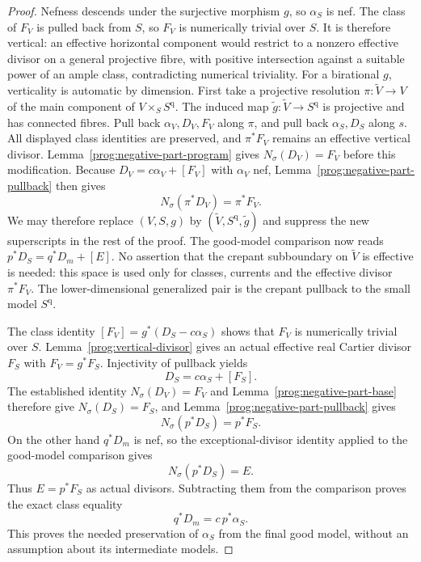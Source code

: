 \begin{proof}
Nefness descends under the surjective morphism $g$, so $\alpha_S$ is nef.
The class of $F_V$ is pulled back from $S$, so $F_V$ is numerically
trivial over $S$. It is therefore vertical: an effective horizontal
component would restrict to a nonzero effective divisor on a general
projective fibre, with positive intersection against a suitable power
of an ample class, contradicting numerical triviality. For a
birational $g$, verticality is automatic by dimension.
First take a projective resolution $\pi:\widetilde V\to V$ of the main
component of $V\times_S S^{\mathrm q}$. The induced map
$\widetilde g:\widetilde V\to S^{\mathrm q}$ is projective and has
connected fibres. Pull back $\alpha_V,D_V,F_V$ along $\pi$, and pull
back $\alpha_S,D_S$ along $s$. All displayed class identities are
preserved, and $\pi^*F_V$ remains an effective vertical divisor.
Lemma~\ref{prog:negative-part-program} gives
$N_\sigma(D_V)=F_V$ before this modification. Because
$D_V=c\alpha_V+[F_V]$ with $\alpha_V$ nef,
Lemma~\ref{prog:negative-part-pullback} then gives
\[
              N_\sigma(\pi^*D_V)=\pi^*F_V.
\]
We may therefore replace $(V,S,g)$ by
$(\widetilde V,S^{\mathrm q},\widetilde g)$ and suppress the new
superscripts in the rest of the proof. The good-model comparison now
reads $p^*D_S=q^*D_m+[E]$. No assertion that the crepant subboundary on
$\widetilde V$ is effective is needed: this space is used only for
classes, currents and the effective divisor $\pi^*F_V$. The
lower-dimensional generalized pair is the crepant pullback to the
small model $S^{\mathrm q}$.

The class identity $[F_V]=g^*(D_S-c\alpha_S)$ shows that $F_V$ is
numerically trivial over $S$. Lemma~\ref{prog:vertical-divisor}
gives an actual effective real Cartier divisor $F_S$ with
$F_V=g^*F_S$. Injectivity of pullback yields
\[
                         D_S=c\alpha_S+[F_S].
\]
The established identity $N_\sigma(D_V)=F_V$ and
Lemma~\ref{prog:negative-part-base} therefore give
$N_\sigma(D_S)=F_S$, and
Lemma~\ref{prog:negative-part-pullback} gives
\[
                         N_\sigma(p^*D_S)=p^*F_S.
\]
On the other hand $q^*D_m$ is nef, so the exceptional-divisor identity
applied to the good-model comparison gives
\[
                         N_\sigma(p^*D_S)=E.
\]
Thus $E=p^*F_S$ as actual divisors. Subtracting them from the comparison
proves the exact class equality
\[
                         q^*D_m=c\,p^*\alpha_S.
\]
This proves the needed preservation of $\alpha_S$ from the final good
model, without an assumption about its intermediate models.


\end{proof}
